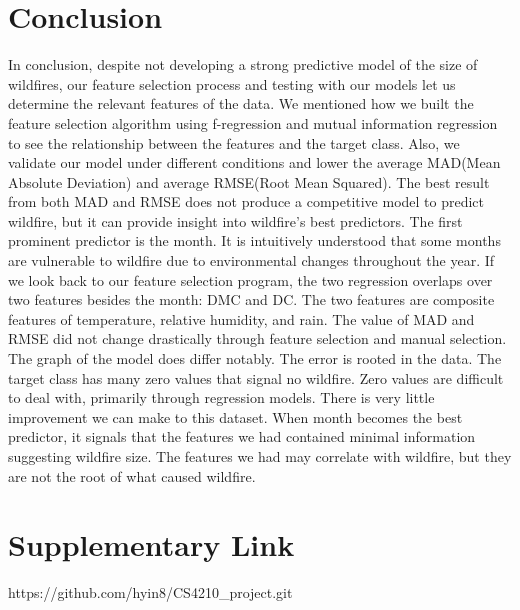 \documentclass[conference]{IEEEtran}
\begin{document}
\section{Conclusion}
In conclusion, despite not developing a strong predictive model of the size of wildfires, our feature selection process and testing with our models let us determine the relevant features of the data. We mentioned how we built the feature selection algorithm using f-regression and mutual information regression to see the relationship between the features and the target class. Also, we validate our model under different conditions and lower the average MAD(Mean Absolute Deviation) and average RMSE(Root Mean Squared). The best result from both MAD and RMSE does not produce a competitive model to predict wildfire, but it can provide insight into wildfire's best predictors. The first prominent predictor is the month. It is intuitively understood that some months are vulnerable to wildfire due to environmental changes throughout the year. If we look back to our feature selection program, the two regression overlaps over two features besides the month: DMC and DC. The two features are composite features of temperature, relative humidity, and rain. The value of MAD and RMSE did not change drastically through feature selection and manual selection. The graph of the model does differ notably. The error is rooted in the data. The target class has many zero values that signal no wildfire. Zero values are difficult to deal with, primarily through regression models. There is very little improvement we can make to this dataset. When month becomes the best predictor, it signals that the features we had contained minimal information suggesting wildfire size. The features we had may correlate with wildfire, but they are not the root of what caused wildfire.

\section{Supplementary Link}
https://github.com/hyin8/CS4210\_project.git
\end{document}
